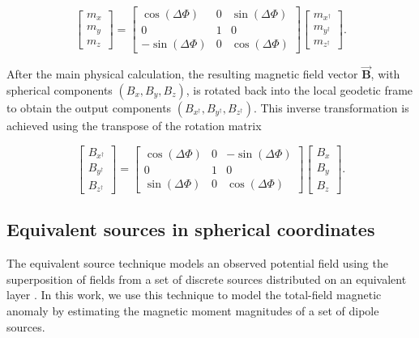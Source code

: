\documentclass[onecolumn,10pt,a4paper]{article}
\begin{document}
\begin{equation}
\begin{bmatrix}
    m_{x} \\
    m_{y} \\
    m_{z}
\end{bmatrix}
=
\begin{bmatrix}
    \cos(\Delta\Phi)  & 0 & \sin(\Delta\Phi) \\
    0 & 1 & 0\\
    -\sin(\Delta\Phi) & 0 & \cos(\Delta\Phi)
\end{bmatrix}
\begin{bmatrix}
    m_{x^{\dagger}} \\
    m_{y^{\dagger}} \\
    m_{z^{\dagger}}
\end{bmatrix} .
\end{equation}

After the main physical calculation, the resulting magnetic field vector $\vec{\mathbf{B}}$, with
spherical components $(B_x, B_y, B_z)$, is rotated back into the local geodetic frame to
obtain the output components $(B_{x^{\dagger}}, B_{y^{\dagger}}, B_{z^{\dagger}})$. This inverse transformation is achieved using the transpose
of the rotation matrix

\begin{equation}
\begin{bmatrix}
    B_{x^{\dagger}} \\
    B_{y^{\dagger}} \\
    B_{z^{\dagger}}
\end{bmatrix}
=
\begin{bmatrix}
    \cos(\Delta\Phi) & 0 & -\sin(\Delta\Phi) \\
    0 & 1 & 0 \\
    \sin(\Delta\Phi) & 0 & \cos(\Delta\Phi)
\end{bmatrix}
\begin{bmatrix}
    B_x \\
    B_y \\
    B_z
\end{bmatrix}.
\end{equation}

\subsection{Equivalent sources in spherical coordinates}

The equivalent source technique models an observed potential field using the superposition of fields
from a set of discrete sources distributed on an equivalent layer \citep{Dampney1969, OliveiraJunior2023}.
In this work, we use this technique to model the total-field magnetic anomaly by estimating the magnetic
moment magnitudes of a set of dipole sources.
\end{document}
